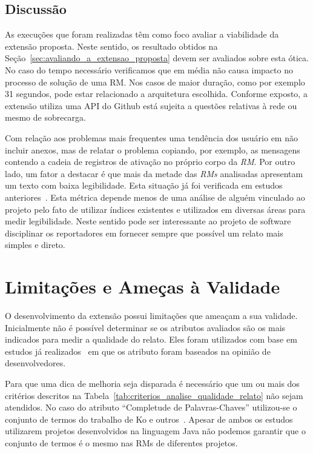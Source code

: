 \subsection{Discussão}
\label{sub:implemtacao_extensao_avaliacao_discussao}

As execuções que foram realizadas têm como foco avaliar a viabilidade da
extensão proposta. Neste sentido, os resultado obtidos na
Seção~\ref{sec:avaliando_a_extensao_proposta} devem ser avaliados sobre esta
ótica. No caso do tempo necessário verificamos que em média não causa impacto no
processo de solução de uma RM\@. Nos casos de maior duração, como por exemplo 31
segundos, pode estar relacionado a arquitetura escolhida. Conforme exposto, a
extensão utiliza uma API do Github está sujeita a questões relativas à rede ou
mesmo de sobrecarga.

Com relação aos problemas mais frequentes uma tendência dos usuário em não
incluir anexos, mas de relatar o problema copiando, por exemplo, as mensagens
contendo a cadeia de registros de ativação no próprio corpo da \textit{RM}. Por
outro lado, um fator a destacar é que mais da metade das \textit{RMs} analisadas
apresentam um texto com baixa legibilidade. Esta situação já foi verificada em
estudos anteriores~\cite{ko2006linguistic, bettenburg2007quality}. Esta métrica
depende menos de uma análise de alguém vinculado ao projeto pelo fato de
utilizar índices existentes e utilizados em diversas áreas para medir
legibilidade. Neste sentido pode ser interessante ao projeto de software
disciplinar os reportadores em fornecer sempre que possível um relato mais
simples e direto.

\section{Limitações e Ameças à Validade}
\label{sec:limitações_e_ameças_à_validade}

O desenvolvimento da extensão possui limitações que ameaçam a sua validade.
Inicialmente não é possível determinar se os atributos avaliados são os mais
indicados para medir a qualidade do relato. Eles foram utilizados com base em
estudos já realizados~\cite{bettenburg2007quality} em que os atributo foram
baseados na opinião de desenvolvedores.

Para que uma dica de melhoria seja disparada é necessário que um ou mais dos
critérios descritos na Tabela~\ref{tab:criterios_analise_qualidade_relato} não
sejam atendidos. No caso do atributo ``Completude de Palavras-Chaves''
utilizou-se o conjunto de termos do trabalho de Ko e
outros~\cite{ko2006linguistic}. Apesar de ambos os estudos utilizarem projetos
desenvolvidos na linguagem Java não podemos garantir que o conjunto de termos é
o mesmo nas RMs de diferentes projetos.

